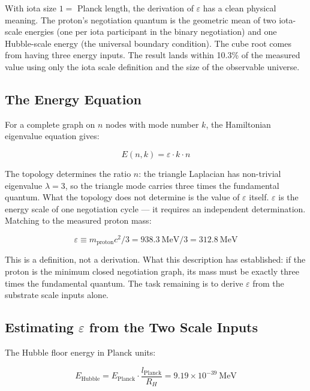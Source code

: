 \documentclass[11pt,letterpaper]{article}
\newenvironment{plainbox}{\begin{tcolorbox}[colback=blue!3!white,colframe=blue!40!white,title={\small\textit{In plain language}},breakable]}{\end{tcolorbox}}
\begin{document}
\begin{plainbox}
With iota size $1 =$ Planck length, the derivation of $\varepsilon$ has a clean physical meaning. The proton's negotiation quantum is the geometric mean of two iota-scale energies (one per iota participant in the binary negotiation) and one Hubble-scale energy (the universal boundary condition). The cube root comes from having three energy inputs. The result lands within 10.3\% of the measured value using only the iota scale definition and the size of the observable universe.
\end{plainbox}

\subsection{The Energy Equation}
\label{sec:org60ff6bf}

For a complete graph on \(n\) nodes with mode number \(k\), the Hamiltonian eigenvalue equation gives:

\begin{equation}
E(n,k) = \varepsilon \cdot k \cdot n
\end{equation}

The topology determines the ratio \(n\): the triangle Laplacian has non-trivial eigenvalue \(\lambda = 3\), so the triangle mode carries three times the fundamental quantum. What the topology does not determine is the value of \(\varepsilon\) itself. \(\varepsilon\) is the energy scale of one negotiation cycle --- it requires an independent determination. Matching to the measured proton mass:

\begin{equation}
\varepsilon \equiv m_\text{proton} c^2 / 3 = 938.3\ \text{MeV} / 3 = 312.8\ \text{MeV}
\end{equation}

This is a definition, not a derivation. What this description has established: if the proton is the minimum closed negotiation graph, its mass must be exactly three times the fundamental quantum. The task remaining is to derive \(\varepsilon\) from the substrate scale inputs alone.

\subsection{Estimating \(\varepsilon\) from the Two Scale Inputs}
\label{sec:org5998f99}

The Hubble floor energy in Planck units:

\begin{equation}
E_\text{Hubble} = E_\text{Planck} \cdot \frac{l_\text{Planck}}{R_H} = 9.19 \times 10^{-39}\ \text{MeV}
\end{equation}
\end{document}
